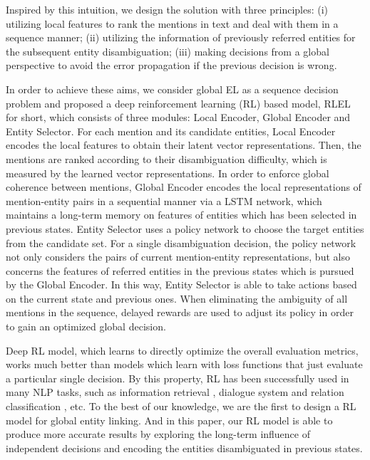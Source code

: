 \documentclass[sigconf]{acmart}
\begin{document}
Inspired by this intuition, we design the solution with three principles: (i) utilizing local features to rank the mentions in text and deal with them in a sequence manner; (ii) utilizing the information of previously referred entities for the subsequent entity disambiguation; (iii) making decisions from a global perspective to avoid the error propagation if the previous decision is wrong.

In order to achieve these aims, we consider global EL as a sequence decision problem and proposed a deep reinforcement learning (RL) based model, RLEL for short, which consists of three modules: Local Encoder, Global Encoder and Entity Selector. For each mention and its candidate entities, Local Encoder encodes the local features to obtain their latent vector representations. Then, the mentions are ranked according to their disambiguation difficulty, which is measured by the learned vector representations. In order to enforce global coherence between mentions, Global Encoder encodes the local representations of mention-entity pairs in a sequential manner via a LSTM network, which maintains a long-term memory on features of entities which has been selected in previous states. Entity Selector uses a policy network to choose the target entities from the candidate set. For a single disambiguation decision, the policy network not only considers the pairs of current mention-entity representations, but also concerns the features of referred entities in the previous states which is pursued by the Global Encoder. In this way, Entity Selector is able to take actions based on the current state and previous ones. When eliminating the ambiguity of all mentions in the sequence, delayed rewards are used to adjust its policy in order to gain an optimized global decision.

Deep RL model, which learns to directly optimize the overall evaluation metrics, works much better than models which learn with loss functions that just evaluate a particular single decision. By this property, RL has been successfully used in many NLP tasks, such as information retrieval \cite{NogueiraC17}, dialogue system \cite{DhingraLLGCAD17} and relation classification \cite{FengHZYZ18}, etc. To the best of our knowledge, we are the first to design a RL model for global entity linking. And in this paper, our RL model is able to produce more accurate results by exploring the long-term influence of independent decisions and encoding the entities disambiguated in previous states.
\end{document}
